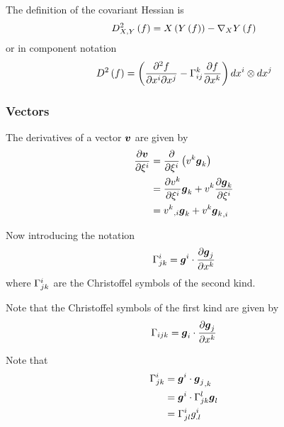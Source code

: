 The definition of the covariant Hessian is
\begin{equation}
  \hessianop{X,Y}{f} = \funccomposition{X}{\funccomposition{Y}{f}}-\funccomposition{\connection{X}{Y}}{f}
\end{equation}
or in component notation
\begin{equation}
  \hessianop{}{f}=\pbrac{\deltwoby{f}{x^{i}}{x^{j}}-\christoffel{k}{i}{j}\delby{f}{x^{k}}}\tensorprod{dx^{i}}{dx^{j}}
\end{equation}



\subsubsection{Vectors}

The derivatives of a vector $\boldsymbol{v}$ are given by
\begin{equation}
  \begin{split}
     \dfrac{\partial \boldsymbol{v}}{\partial \xi^{i}}  &=
     \dfrac{\partial }{\partial \xi^{i}} \left( v^{k}\boldsymbol{g}_{k} \right) \\
    &=  \dfrac{\partial v^{k}}{\partial \xi^{i}} \boldsymbol{g}_{k}+v^{k} \dfrac{\partial \boldsymbol{g}_{k}}{\partial \xi^{i}}  \\
    &=  {v^{k}}_{,i} \boldsymbol{g}_{k}+v^{k} {\boldsymbol{g}_{k}}_{,i} 
  \end{split}
\end{equation}

Now introducing the notation
\begin{equation}
   \Gamma^{i}_{jk}  =  \boldsymbol{g}^{i} \cdot  \dfrac{\partial \boldsymbol{g}_{j}}{\partial x^{k}}  
\end{equation}
where $ \Gamma^{i}_{jk} $ are the Christoffel symbols of the second
kind. 

Note that the Christoffel symbols of the first kind are given by
\begin{equation}
   \Gamma_{ijk}  =  \boldsymbol{g}_{i} \cdot  \dfrac{\partial \boldsymbol{g}_{j}}{\partial x^{k}}  
\end{equation}

Note that
\begin{equation}
  \begin{split}
     \Gamma^{i}_{jk}  &=  \boldsymbol{g}^{i} \cdot  {\ensuremath{\boldsymbol{g}}_{j}}_{,k}   \\
    &= \boldsymbol{g}^{i} \cdot  \Gamma^{l}_{jk} \boldsymbol{g}_{l}  \\
    &=  \Gamma^{i}_{jl} g^{i}_{.l} 
  \end{split}
\end{equation}

